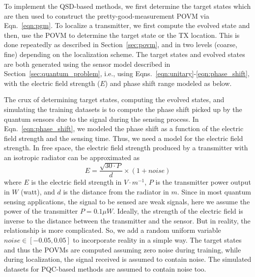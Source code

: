 To implement the QSD-based methods, we first determine the target states which are then used to construct the pretty-good-measurement POVM via Eqn.~\ref{eqn:pgm}.
To localize a transmitter, we first compute the evolved state and then, use the POVM to determine the target state or the TX location. 
This is done repeatedly as described in Section~\ref{sec:povm}, and in two levels (coarse, fine) depending on the localization scheme. 
The target states and evolved states are both generated using the sensor model described
in Section~\ref{sec:quantum_problem}, i.e., using Eqns.~\ref{eqn:unitary}-\ref{eqn:phase_shift}, with the electric field strength ($E$) and phase shift range modeled as below. 

The crux of determining target states, computing the evolved states, and simulating the training datasets is to compute the phase shift picked up by the quantum sensors due to the signal during the sensing process.
In Eqn.~\ref{eqn:phase_shift}, we modeled the phase shift as a function of the electric field strength and the sensing time.
Thus, we need a model for the electric field strength.
In free space, the electric field strength produced by a transmitter with an isotropic radiator can be approximated as~\cite{e-field-wiki}
$$E = \frac{\sqrt{30 \cdot P}}{d} \times (1 + noise) $$
where $E$ is the electric field strength in $V\cdot m^{-1}$, $P$ is the transmitter power output in $W$ (watt), and $d$ is the distance from the radiator in $m$.
Since in most quantum sensing applications, the signal to be sensed are weak signals, here we assume the power of the transmitter $P=0.1 \mu W$.
Ideally, the strength of the electric field is inverse to the distance between the transmitter and the sensor.
But in reality, the relationship is more complicated.
So, we add a random uniform variable $ noise\in[-0.05, 0.05]$ to incorporate reality in a simple way.
The target states and thus the POVMs are computed assuming zero noise during training, while during localization, the signal received is assumed to contain noise. 
The simulated datasets for PQC-based methods are assumed to contain noise too.

